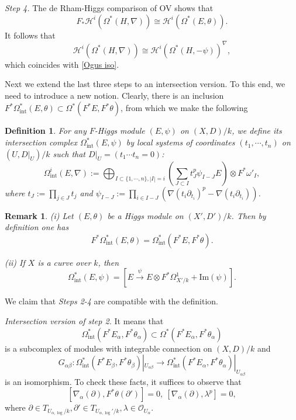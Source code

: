 \documentclass[12pt, a4paper]{article}
\newtheorem{definition}{Definition}[section]
\newtheorem{remark}{Remark}[section]
\begin{document}
{\itshape Step 4.} The de Rham-Higgs comparison of OV shows that 
$$
F_*\mathcal H^i(\Omega^*(H,\nabla))\cong\mathcal H^i(\Omega^*(E,\theta)).
$$
It follows that
$$
\mathcal H^i(\Omega^*(H,\nabla))\cong\mathcal H^i(\Omega^*(H,-\psi))^\nabla,
$$
which coincides with \eqref{Ogus iso}.

Next we extend the last three steps to an intersection version.  To this end, we need to introduce a new notion. Clearly, there is an inclusion $F^*\Omega_\mathrm{int}^*(E,\theta)\subset\Omega^*(F^*E,F^*\theta)$, from which we make the following
\begin{definition}
For any $F$-Higgs module $(E,\psi)$ on $(X,D)/k$, we define its intersection complex $\Omega_\mathrm{int}^*(E,\psi)$ by local systems of coordinates $(t_1,\cdots,t_n)$ on $(U,D|_U)/k$ such that $D|_U=(t_1\cdots t_n=0)$:
$$
\Omega^i_\mathrm{int}(E,\nabla):=\bigoplus_{I\subset\{1,\cdots,n\},|I|=i}(\sum_{J\subset I}t_J^p\psi_{I-J}E)\otimes F^*\omega'_I,
$$
where $t_J:=\prod_{j\in J}t_j$ and $\psi_{I-J}:=\prod_{i\in I-J}(\nabla(t_i\partial_{t_i})^p-\nabla(t_i\partial_{t_i}))$. 
\end{definition}
\begin{remark}
 (i) Let $(E,\theta)$ be a Higgs module on $(X',D')/k$. Then by definition one has
$$
F^*\Omega_\mathrm{int}^*(E,\theta)=\Omega_\mathrm{int}^*(F^*E,F^*\theta).
$$

(ii) If $X$ is a curve over $k$, then
$$
\Omega_\mathrm{int}^*(E,\psi)=[E\stackrel{\psi}{\longrightarrow}E\otimes F^*\Omega^1_{X'/k}+\mathrm{Im}(\psi)].
$$
\end{remark}
We claim that {\itshape Steps 2-4} are compatible with the definition. 

{\itshape Intersection version of step 2.} It means that 
$$
\Omega_\mathrm{int}^*(F^*E_\alpha,F^*\theta_\alpha)\subset\Omega^*(F^*E_\alpha,F^*\theta_\alpha)
$$
is a subcomplex of modules with integrable connection on $(X,D)/k$ and 
$$
G_{\alpha\beta}:\Omega_\mathrm{int}^*(F^*E_\beta,F^*\theta_\beta)|_{U_{\alpha\beta}}\to\Omega_\mathrm{int}^*(F^*E_\alpha,F^*\theta_\alpha)|_{U_{\alpha\beta}}
$$
is an isomorphism.
To check these facts, it suffices to observe that
$$
[\nabla_\alpha(\partial), F^*\theta(\partial')]=0,~[\nabla_\alpha(\partial),\lambda^p]=0,
$$
where $\partial\in T_{U_{\alpha,\log}/k},\partial'\in T_{U_{\alpha,\log}'/k},\lambda\in\mathcal O_{U_\alpha}$.
\end{document}
